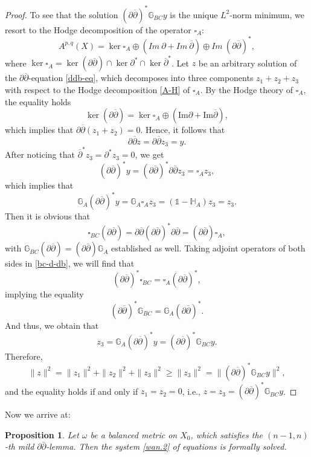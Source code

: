 \documentclass[12pt]{amsart}
\numberwithin{equation}{section}
\newtheorem{proposition}[theorem]{Proposition}
\renewcommand{\1}{\mathds{1}}
\newcommand{\G}{\mathbb{G}}
\newcommand{\db}{\overline{\partial}}
\renewcommand{\>}{\rightarrow}
\newcommand{\p}{\partial}
\def\p{\partial}
\def\b{\bar}
\begin{document}
\begin{proof}
To see that the solution $(\p\db)^*\G_{BC}y$ is the unique
$L^2$-norm minimum, we resort to the Hodge decomposition of the
operator $\square_{A}$:
\begin{equation}\label{A-H}
A^{p,q}(X)=\ker\square_{A} \oplus (Im~\p +Im~\db ) \oplus
Im~(\p\db)^*,
\end{equation}
where $\ker \square_{A} = \ker (\p \db) \cap \ker \p^* \cap \ker
\db^*$. Let $z$ be an arbitrary solution of the $\p\db$-equation
\eqref{ddb-eq}, which decomposes into three components $z_1 + z_2
+z_3$ with respect to the Hodge decomposition \eqref{A-H} of
$\square_{A}$. By the Hodge theory of $\square_{A}$, the equality
holds
\[ \ker (\p\db) = \ker \square_{A} \oplus ( \textrm{Im}\p + \textrm{Im}\db ) ,\]
which implies that $\p \db (z_1 + z_2)=0$. Hence, it follows that
\[ \p \db z = \p \db z_3 =y. \]
After noticing that $\db^* z_3 = \p^* z_3 =0$, we get
\[ (\p\db)^* y = (\p\db)^* \p \db z_3 = \square_{A} z_3, \]
which implies that
\[ \mathbb{G}_{A} (\p\db)^* y = \mathbb{G}_{A} \square_{A} z_3= (\1-\mathbb{H}_{A})z_3 = z_3. \]
Then it is obvious that
\begin{equation}\label{bc-d-db}
\square_{BC} (\p\db)=\p \db (\p\db)^* \p \db=(\p\db)\square_{A},
\end{equation}
with $\G_{BC}(\p\db)=(\p\db)\G_{A}$ established as well. Taking
adjoint operators of both sides in \eqref{bc-d-db}, we will find
that
\[  (\p\db)^* \square_{BC} = \square_{A} (\p\db)^*,\]
implying the equality
\[(\p\db)^*\mathbb{G}_{BC}=\mathbb{G}_{A}(\p\db)^*.\] And thus, we
obtain that
\[ z_3 =  \mathbb{G}_{A} (\p\db)^* y = (\p\db)^*\mathbb{G}_{BC} y. \]
Therefore, \[ \|z\|^2 = \|z_1\|^2 +\|z_2\|^2+\|z_3\|^2\geq \|z_3\|^2
= \|(\p\db)^*\mathbb{G}_{BC}y \|^2, \] and the equality holds if and
only if $z_1 =z_2 =0$, i.e., $z=z_3=(\p\db)^*\mathbb{G}_{BC} y$.
\end{proof}


Now we arrive at:
\begin{proposition}\label{fml-blc}
Let $\omega$ be a balanced metric on $X_0$, which satisfies the
$(n-1,n)$-th mild $\p\b{\p}$-lemma. Then the system \eqref{wan.2} of
equations is formally solved.
\end{proposition}
\end{document}
